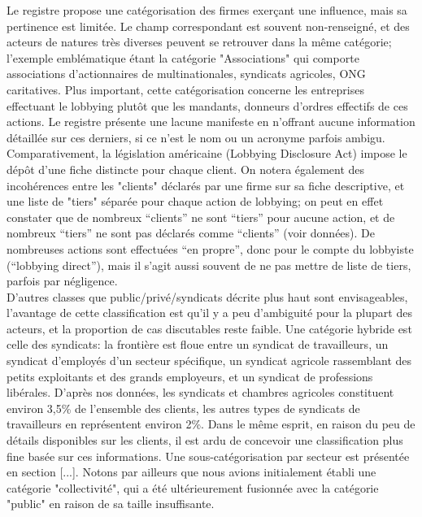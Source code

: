 \documentclass[a4paper,12pt]{article}
\begin{document}
Le registre propose une catégorisation des firmes exer\c cant une influence, mais sa pertinence est limitée. Le champ correspondant est souvent non-renseigné, et  des acteurs de natures très diverses peuvent se retrouver dans la m\^eme catégorie; l'exemple emblématique étant  la catégorie "Associations" qui comporte  associations d'actionnaires de multinationales, syndicats agricoles, ONG caritatives. Plus important, cette catégorisation concerne les entreprises effectuant le lobbying plutôt que les mandants, donneurs d'ordres effectifs de ces actions. Le registre présente une lacune manifeste en n'offrant aucune information détaillée sur ces derniers, si ce n'est le nom ou un acronyme parfois ambigu. Comparativement, la législation américaine (Lobbying Disclosure Act) impose le dépôt d'une fiche distincte pour chaque client. On notera également des incohérences entre les "clients" déclarés par une firme sur sa fiche descriptive, et une liste de "tiers" séparée pour chaque action de lobbying; on peut en effet constater que de nombreux ``clients'' ne sont ``tiers'' pour aucune action, et de nombreux ``tiers'' ne sont pas déclarés comme ``clients'' (voir données). De nombreuses actions sont effectuées ``en propre'', donc pour le compte du lobbyiste (``lobbying direct''), mais il s'agit aussi souvent de ne pas mettre de liste de tiers, parfois par négligence.\\

D'autres classes que public/privé/syndicats décrite plus haut sont envisageables, l'avantage de cette classification est qu'il y a peu d'ambiguité pour la plupart des acteurs, et la proportion de cas discutables reste faible.
Une catégorie hybride est celle des syndicats: la frontière est floue entre un syndicat de travailleurs, un syndicat d'employés d'un secteur spécifique, un syndicat agricole rassemblant des petits exploitants et des grands employeurs, et un syndicat de professions libérales. D'après nos données, les syndicats et chambres agricoles constituent environ 3,5\% de l'ensemble des clients, les autres types de syndicats de travailleurs en représentent environ 2\%. 
 Dans le même esprit, en raison du peu de détails disponibles sur les clients, il est ardu de concevoir une classification plus fine basée sur ces informations. Une sous-catégorisation par secteur est présentée en section [...]. Notons par ailleurs que nous avions initialement établi une catégorie "collectivité", qui a été ultérieurement fusionnée avec la catégorie "public" en raison de sa taille insuffisante. 
\end{document}
